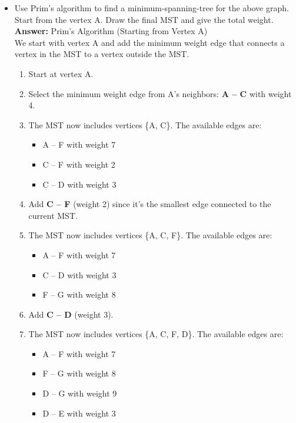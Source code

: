 \documentclass[12pt]{article}
\theoremstyle{plain}
\begin{document}
\begin{itemize}
    \item[(a)] Use Prim's algorithm to find a minimum-spanning-tree  for the above graph. Start from the vertex A. Draw the final MST and give the total weight. \\
    \textbf{Answer: }Prim's Algorithm (Starting from Vertex A) \\
    We start with vertex A and add the minimum weight edge that connects a vertex in the MST to a vertex outside the MST.
    \begin{enumerate}
        \item Start at vertex A.
        \item Select the minimum weight edge from A's neighbors: \textbf{A -- C} with weight 4.
        \item The MST now includes vertices \{A, C\}. The available edges are:
            \begin{itemize}
                \item A -- F with weight 7
                \item C -- F with weight 2
                \item C -- D with weight 3
            \end{itemize}
        \item Add \textbf{C -- F} (weight 2) since it’s the smallest edge connected to the current MST.
        \item The MST now includes vertices \{A, C, F\}. The available edges are:
            \begin{itemize}
                \item A -- F with weight 7
                \item C -- D with weight 3
                \item F -- G with weight 8
            \end{itemize}
        \item Add \textbf{C -- D} (weight 3).
        \item The MST now includes vertices \{A, C, F, D\}. The available edges are:
            \begin{itemize}
                \item A -- F with weight 7
                \item F -- G with weight 8
                \item D -- G with weight 9
                \item D -- E with weight 3
            \end{itemize}

\end{enumerate}
\end{itemize}
\end{document}
